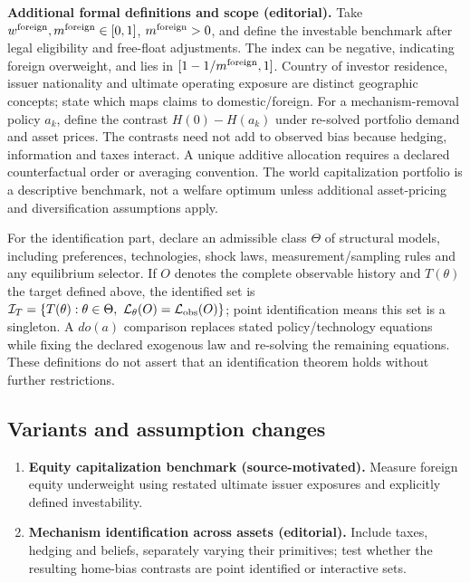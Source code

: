 \documentclass[11pt,a4paper]{article}
\begin{document}
\textbf{Additional formal definitions and scope (editorial).} Take \(w^{\rm foreign},m^{\rm foreign}\in[0,1]\), \(m^{\rm foreign}>0\), and define the investable benchmark after legal eligibility and free-float adjustments. The index can be negative, indicating foreign overweight, and lies in \([1-1/m^{\rm foreign},1]\). Country of investor residence, issuer nationality and ultimate operating exposure are distinct geographic concepts; state which maps claims to domestic/foreign. For a mechanism-removal policy \(a_k\), define the contrast \(H(0)-H(a_k)\) under re-solved portfolio demand and asset prices. The contrasts need not add to observed bias because hedging, information and taxes interact. A unique additive allocation requires a declared counterfactual order or averaging convention. The world capitalization portfolio is a descriptive benchmark, not a welfare optimum unless additional asset-pricing and diversification assumptions apply.

For the identification part, declare an admissible class \(\Theta\) of structural models, including preferences, technologies, shock laws, measurement/sampling rules and any equilibrium selector. If \(O\) denotes the complete observable history and \(T(\theta)\) the target defined above, the identified set is \(\mathcal I_T=\{T(\theta):\theta\in\Theta,\ \mathcal L_\theta(O)=\mathcal L_{\rm obs}(O)\}\); point identification means this set is a singleton. A \(do(a)\) comparison replaces stated policy/technology equations while fixing the declared exogenous law and re-solving the remaining equations. These definitions do not assert that an identification theorem holds without further restrictions.
\subsection*{Variants and assumption changes}
\begin{enumerate}
\item \textbf{Equity capitalization benchmark (source-motivated).} Measure foreign equity underweight using restated ultimate issuer exposures and explicitly defined investability.
\item \textbf{Mechanism identification across assets (editorial).} Include taxes, hedging and beliefs, separately varying their primitives; test whether the resulting home-bias contrasts are point identified or interactive sets.
\end{enumerate}
\end{document}

